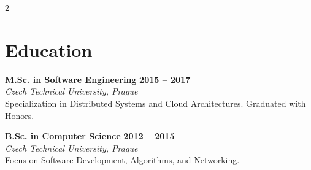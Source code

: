 \documentclass[10pt,a4paper]{article}
\newcommand{\educationentry}[4]{%
  \vspace{6pt}
  {\normalfont\large\bfseries\color{darkneutral} #1} \hfill {\normalfont\color{accent}\bfseries #2} \\
  {\normalfont\itshape\color{textgray} #3} \\
  \vspace{2pt}
  {\normalfont\small\color{textgray} #4}
  \vspace{4pt}
}
\begin{document}
\begin{paracol}{2}
  \section{Education}
  
  \educationentry{M.Sc. in Software Engineering}{2015 -- 2017}{Czech Technical University, Prague}{%
    Specialization in Distributed Systems and Cloud Architectures. Graduated with Honors.
  }
  
  \educationentry{B.Sc. in Computer Science}{2012 -- 2015}{Czech Technical University, Prague}{%
    Focus on Software Development, Algorithms, and Networking.
  }

\end{paracol}
\end{document}
